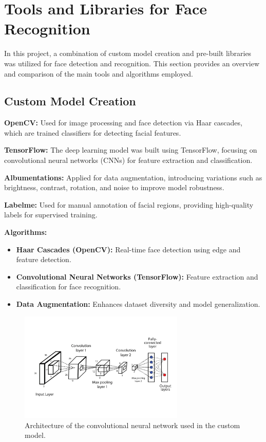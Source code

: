 \section{Tools and Libraries for Face Recognition}

In this project, a combination of custom model creation and pre-built libraries was utilized for face detection and recognition. This section provides an overview and comparison of the main tools and algorithms employed.

\subsection{Custom Model Creation}

\textbf{OpenCV:} Used for image processing and face detection via Haar cascades, which are trained classifiers for detecting facial features.

\textbf{TensorFlow:} The deep learning model was built using TensorFlow, focusing on convolutional neural networks (CNNs) for feature extraction and classification.

\textbf{Albumentations:} Applied for data augmentation, introducing variations such as brightness, contrast, rotation, and noise to improve model robustness.

\textbf{Labelme:} Used for manual annotation of facial regions, providing high-quality labels for supervised training.

\textbf{Algorithms:}
\begin{itemize}
    \item \textbf{Haar Cascades (OpenCV):} Real-time face detection using edge and feature detection.
    \item \textbf{Convolutional Neural Networks (TensorFlow):} Feature extraction and classification for face recognition.
    \item \textbf{Data Augmentation:} Enhances dataset diversity and model generalization.
\end{itemize}

\begin{figure}[ht!]
    \centering
    \includegraphics[width=0.7\textwidth]{../Files/convolutional_network_architecture.png}
    \caption{Architecture of the convolutional neural network used in the custom model.}
    \label{fig:cnn-architecture}
\end{figure}

